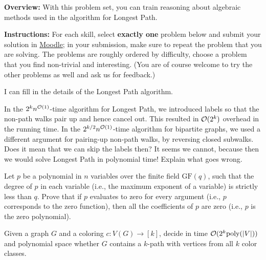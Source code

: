 \documentclass[english]{uebung_cs}
\begin{document}
\textbf{Overview:} With this problem set, you can train reasoning about algebraic methods used in the algorithm for Longest Path.

\textbf{Instructions:} For each skill, select \textbf{exactly one} problem below and submit your solution in \href{https://moodle.studiumdigitale.uni-frankfurt.de/moodle/course/view.php?id=6259}{Moodle}; in your submission, make sure to repeat the problem that you are solving.
The problems are roughly ordered by difficulty, choose a problem that you find non-trivial and interesting. (You are of course welcome to try the other problems as well and ask us for feedback.)

\begin{skill}
  I can fill in the details of the Longest Path algorithm.
\end{skill}

\begin{exercise}
  In the \(2^{k} n^{\mathcal{O}(1)}\)-time algorithm for Longest Path, we introduced labels so that the non-path walks pair up and hence cancel out. This resulted in \(\mathcal{O}(2^k)\) overhead in the running time. In the \(2^{k/2} n^{\mathcal{O}(1)}\)-time algorithm for bipartite graphs, we used a different argument for pairing-up non-path walks, by reversing closed subwalks. Does it mean that we can skip the labels then? It seems we cannot, because then we would solve Longest Path in polynomial time! Explain what goes wrong.
\end{exercise}

\begin{exercise}
  Let \( p \) be a polynomial in \( n \) variables over the finite field \( \text{GF}(q) \), such that the degree of \( p \) in each variable (i.e., the maximum exponent of a variable) is strictly less than \( q \). Prove that if \( p \) evaluates to zero for every argument (i.e., \( p \) corresponds to the zero function), then all the coefficients of \( p \) are zero (i.e., \( p \) is the zero polynomial).
\end{exercise}

\begin{exercise}
  Given a graph \( G \) and a coloring \( c : V(G) \to [k] \), decide in time \( \mathcal{O}(2^k \mathrm{poly}(|V|)) \) and polynomial space whether \( G \) contains a \( k \)-path with vertices from all \( k \) color classes.
\end{exercise}
\end{document}
